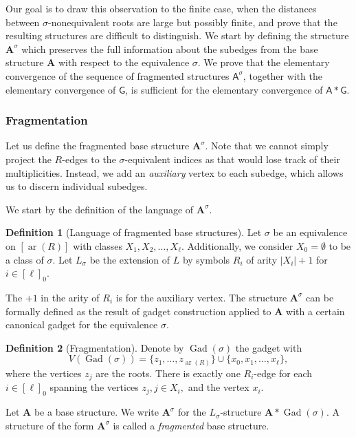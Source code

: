 \documentclass[11pt]{article}
\theoremstyle{plain}
\theoremstyle{definition}
\newtheorem{definition}{Definition}
\theoremstyle{remark}
\DeclareMathOperator\Gad{Gad}
\DeclareMathOperator\aritysym{ar}
\newcommand{\arity}[1]{{\aritysym({#1})}}
\newcommand{\str}[1]{\mathbf{#1}}
\newcommand{\strseq}[1]{{\boldsymbol{\mathsf{#1}}}}
\begin{document}
Our goal is to draw this observation to the finite case, when the distances between $\sigma$-nonequivalent roots are large but possibly finite, and prove that the resulting structures are difficult to distinguish.
We start by defining the structure $\str{A}^\sigma$ which preserves the full information about the subedges from the base structure $\str{A}$ with respect to the equivalence $\sigma$.
We prove that the elementary convergence of the sequence of fragmented structures $\strseq{A}^\sigma$, together with the elementary convergence of $\strseq{G}$, is sufficient for the elementary convergence of $\strseq{A}*\strseq{G}$.

\subsubsection{Fragmentation}\label{sssec:fragmentation}

Let us define the fragmented base structure $\str{A}^\sigma$.
Note that we cannot simply project the $R$-edges to the $\sigma$-equivalent indices as that would lose track of their multiplicities.
Instead, we add an \emph{auxiliary} vertex to each subedge, which allows us to discern individual subedges.

We start by the definition of the language of $\str{A}^\sigma$.

\begin{definition}[Language of fragmented base structures]
    Let $\sigma$ be an equivalence on $[\arity{R}]$ with classes $X_1, X_2, \dots, X_\ell$.
    Additionally, we consider $X_0 = \emptyset$ to be a class of $\sigma$.
    Let $L_\sigma$ be the extension of $L$ by symbols $R_i$ of arity $|X_i| + 1$ for $i \in [\ell]_0$.
\end{definition}

The $+1$ in the arity of $R_i$ is for the auxiliary vertex.
The structure $\str{A}^\sigma$ can be formally defined as the result of gadget construction applied to $\str{A}$ with a certain canonical gadget for the equivalence $\sigma$.

\begin{definition}[Fragmentation]\label{def:fragmentation}
    Denote by $\Gad(\sigma)$ the gadget with
    \[
        V(\Gad(\sigma)) = \{z_1, \dots, z_{\arity{R}}\} \cup \{x_0, x_1, \dots, x_\ell\},
    \]
    where the vertices $z_j$ are the roots.
    There is exactly one $R_i$-edge for each $i \in [\ell]_0$ spanning the vertices $z_j, j \in X_i,$ and the vertex $x_i$.
    
    Let $\str{A}$ be a base structure.
    We write $\str{A}^\sigma$ for the $L_\sigma$-structure $\str{A} * \Gad(\sigma)$.
    A structure of the form $\str{A}^\sigma$ is called a \emph{fragmented} base structure.
\end{definition}
\end{document}

